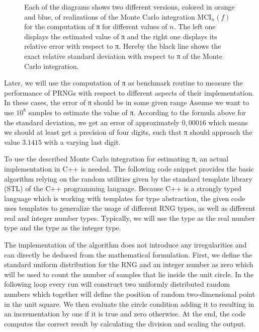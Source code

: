 \documentclass{stdlocal}
\begin{document}
\begin{figure}
\begin{subfigure}[b]{0.49\linewidth}
      \end{subfigure}
      \caption[Monte Carlo Integration Plots for the Computation of π]{%
        Each of the diagrams shows two different versions, colored in orange and blue, of realizations of the Monte Carlo integration $\mathrm{MCI}_n(f)$ for the computation of π for different values of $n$.
        The left one displays the estimated value of π and the right one displays its relative error with respect to π.
        Hereby the black line shows the exact relative standard deviation with respect to π of the Monte Carlo integration.
      }
      \label{fig:pi-computation-plots}
    \end{figure}

    Later, we will use the computation of π as benchmark routine to measure the performance of PRNGs with respect to different aspects of their implementation.
    In these cases, the error of π should be in some given range
    Assume we want to use $10^8$ samples to estimate the value of π.
    According to the formula above for the standard deviation, we get an error of approximately $0,00016$ which means we should at least get a precision of four digits, such that π should approach the value $3.1415$ with a varying last digit.

    To use the described Monte Carlo integration for estimating π, an actual implementation in C++ is needed.
    The following code snippet provides the basic algorithm relying on the random utilities given by the standard template library (STL) of the C++ programming language.
    Because C++ is a strongly typed language which is working with templates for type abstraction, the given code uses templates to generalize the usage of different RNG types, as well as different real and integer number types.
    Typically, we will use the  type as the real number type and the  type as the integer type.

    The implementation of the algorithm does not introduce any irregularities and can directly be deduced from the mathematical formulation.
    First, we define the standard uniform distribution for the RNG and an integer number  as zero which will be used to count the number of samples that lie inside the unit circle.
    In the following  loop every run will construct two uniformly distributed random numbers which together will define the position of random two-dimensional point in the unit square.
    We then evaluate the circle condition adding it to  resulting in an incrementation by one if it is true and zero otherwise.
    At the end, the code computes the correct result by calculating the division and scaling the output.
\end{document}
